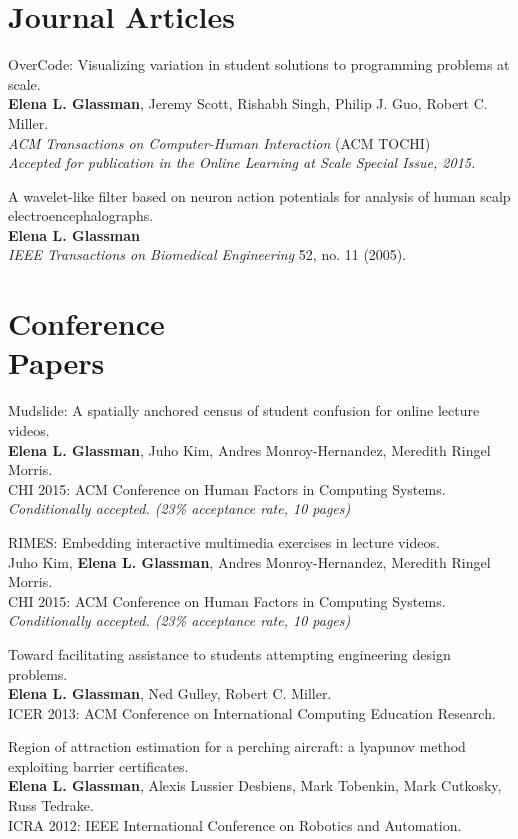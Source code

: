 \documentclass[margin]{res}
\begin{document}
\begin{resume}
\section{Journal Articles}

OverCode: Visualizing variation in student solutions to programming problems at scale.\\
{\bf Elena L. Glassman}, Jeremy Scott, Rishabh Singh, Philip J. Guo, Robert C. Miller. \\ 
{\it ACM Transactions on Computer-Human Interaction} (ACM TOCHI)\\
{\it Accepted for publication in the Online Learning at Scale Special Issue, 2015.}

A wavelet-like filter based on neuron action potentials for analysis of human scalp electroencephalographs.\\ 
{\bf Elena L. Glassman}\\
\textit{IEEE Transactions on Biomedical Engineering} 52, no. 11 (2005).

\section{Conference\\ Papers}

Mudslide: A spatially anchored census of student confusion for online lecture videos.\\
{\bf Elena L. Glassman}, Juho Kim, Andres Monroy-Hernandez, Meredith Ringel Morris.\\
CHI 2015: ACM Conference on Human Factors in Computing Systems.\\
{\it Conditionally accepted. (23\% acceptance rate, 10 pages)}

RIMES: Embedding interactive multimedia exercises in lecture videos.\\
Juho Kim, {\bf Elena L. Glassman}, Andres Monroy-Hernandez, Meredith Ringel Morris. \\
CHI 2015: ACM Conference on Human Factors in Computing Systems.\\
{\it Conditionally accepted. (23\% acceptance rate, 10 pages)}

Toward facilitating assistance to students attempting engineering design problems.\\
{\bf Elena L. Glassman}, Ned Gulley, Robert C. Miller. \\
ICER 2013: ACM Conference on International Computing Education Research.

Region of attraction estimation for a perching aircraft: a lyapunov method exploiting barrier certificates.\\
{\bf Elena L. Glassman}, Alexis Lussier Desbiens, Mark Tobenkin, Mark Cutkosky, Russ Tedrake.\\
ICRA 2012: IEEE International Conference on Robotics and Automation.


\end{resume}
\end{document}
